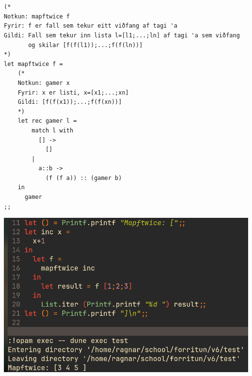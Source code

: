 \documentclass{article}
\begin{document}
	\section{}
	\begin{verbatim}
(*
Notkun: mapftwice f
Fyrir: f er fall sem tekur eitt viðfang af tagi 'a
Gildi: Fall sem tekur inn lista l=[l1;...;ln] af tagi 'a sem viðfang 
       og skilar [f(f(l1));...;f(f(ln))]
*)
let mapftwice f =
    (*
    Notkun: gamer x
    Fyrir: x er listi, x=[x1;...;xn]
    Gildi: [f(f(x1));...;f(f(xn))]
    *)
    let rec gamer l =
        match l with
          [] ->
            []
        |
          a::b ->
            (f (f a)) :: (gamer b)
    in 
      gamer
;;
	\end{verbatim}
	\begin{center}
		\includegraphics[scale=0.35]{mapftwice.png}
	\end{center}
\end{document}
